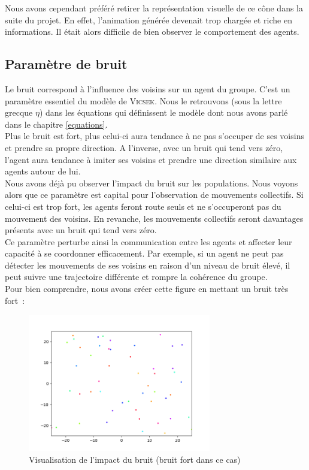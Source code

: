 \documentclass[french, a4paper, 12pt, openany]{report}
\begin{document}
	Nous avons cependant préféré retirer la représentation visuelle de ce cône dans la suite du projet. En effet, l'animation générée devenait trop chargée et riche en informations. Il était alors difficile de bien observer le comportement des agents.\\  
  
  \subsection{Paramètre de bruit}
    
   Le bruit correspond à l'influence des voisins sur un agent du groupe. C'est un paramètre essentiel du modèle de \textsc{Vicsek}. Nous le retrouvons (sous la lettre grecque $\eta$)  dans les équations qui définissent le modèle dont nous avons parlé dans le chapitre \ref{equations}.\\
   
   Plus le bruit est fort, plus celui-ci aura tendance à ne pas s'occuper de ses voisins et prendre sa propre direction. A l'inverse, avec un bruit qui tend vers zéro, l'agent aura tendance à imiter ses voisins et prendre une direction similaire aux agents autour de lui. \\
    
   Nous avons déjà pu observer l'impact du bruit sur les populations. Nous voyons alors que ce paramètre est capital pour l'observation de mouvements collectifs. Si celui-ci est trop fort, les agents feront route seuls et ne s'occuperont pas du mouvement des voisins. En revanche, les mouvements collectifs seront davantages présents avec un bruit qui tend vers zéro.\\

   Ce paramètre perturbe ainsi la communication entre les agents et affecter leur capacité à se coordonner efficacement. Par exemple, si un agent ne peut pas détecter les mouvements de ses voisins en raison d'un niveau de bruit élevé, il peut suivre une trajectoire différente et rompre la cohérence du groupe.\\

\newpage
Pour bien comprendre, nous avons créer cette figure en mettant un bruit très fort~:


   \begin{figure}[!h]
		\centering
		\includegraphics[width=8cm]{images/image_10.png}
		\caption{Visualisation de l'impact du bruit (bruit fort dans ce cas)}
		\label{bruit}
	\end{figure}  
\end{document}
